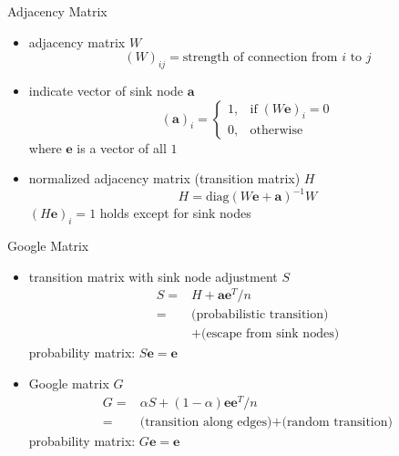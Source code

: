 \documentclass[fleqn,aspectratio=1610]{beamer}
\begin{document}
\begin{frame}[label={sec:org8f28ceb}]{Adjacency Matrix}
\begin{itemize}
\item adjacency matrix \(W\)
\begin{equation}
  (W)_{ij} = \text{strength of connection from \(i\) to \(j\)}
\end{equation}
\item indicate vector of sink node \(\boldsymbol{a}\)
\begin{equation}
  (\boldsymbol{a})_i =
  \begin{cases}
    1, & \text{if}\;(W\boldsymbol{e})_i = 0\\
    0, & \text{otherwise}
  \end{cases}
\end{equation}
where \(\boldsymbol{e}\) is a vector of all \(1\)
\item normalized adjacency matrix (transition matrix) \(H\) 
\begin{equation}
  H = \mathrm{diag}(W\boldsymbol{e}+\boldsymbol{a})^{-1} W
\end{equation}
\((H\boldsymbol{e})_i=1\) holds except for sink nodes
\end{itemize}
\end{frame}

\begin{frame}[label={sec:org26cb980}]{Google Matrix}
\begin{itemize}
\item transition matrix with sink node adjustment \(S\)
\begin{align}
  S =& H + \boldsymbol{a}\boldsymbol{e}^T/n\\
  =&\text{(probabilistic transition)}\\
     &+\text{(escape from sink nodes)}
\end{align}
probability matrix: \(S\boldsymbol{e}=\boldsymbol{e}\)
\item Google matrix \(G\)
\begin{align}
  G
  =& \alpha S + (1-\alpha) \boldsymbol{e}\boldsymbol{e}^T/n\\
  =&\text{(transition along edges)}
     +\text{(random transition)}
\end{align}
probability matrix: \(G\boldsymbol{e}=\boldsymbol{e}\)
\end{itemize}
\end{frame}
\end{document}
